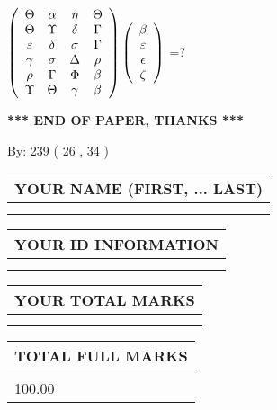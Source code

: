 \documentclass[12pt]{article}
\begin{document}
 
$  %
 \left( \begin{array}
 {
 c
 c
 c
 c
 }
 \Theta & 
 \alpha & 
 \eta & 
 \Theta \\ 
 \Theta & 
 \Upsilon & 
 \delta & 
 \Gamma \\ 
 \varepsilon & 
 \delta & 
 \sigma & 
 \Gamma \\ 
 \gamma & 
 \sigma & 
 \Delta & 
 \rho \\ 
 \rho & 
 \Gamma & 
 \Phi & 
 \beta \\ 
 \Upsilon & 
 \Theta & 
 \gamma & 
 \beta
 \end{array} \right)
 \left( \begin{array}
 {
 c
 }
 \beta \\ 
 \varepsilon \\ 
 \epsilon \\ 
                    \zeta
 \end{array} \right)
$ =?
 

 

 
\vspace{0.3in}
   
   
 \vspace{0.2in}
 
   
   
   
   
\vspace{1.0in} 
{\textbf{\large{ *** END OF PAPER, THANKS *** }}} 
   
   
\hspace{1.0in} By: 
         239 (          26 ,           34 )
   
   
   
   
\newpage 
\setcounter{page}{ 
    28001 } 
   
   
   
   
\noindent\begin{tabular}{|l|}
\hline
YOUR NAME (FIRST, ... LAST)  \\
\hline
 \\ 
 \\ 
\hline
\end{tabular}
\hspace{0.05in} \begin{tabular}{|l|}
\hline
 YOUR   ID   INFORMATION  \\
\hline
 \\ 
 \\ 
\hline
\end{tabular}
   
   
\vspace{0.2in}\noindent\begin{tabular}{|l|}
\hline
YOUR TOTAL MARKS  \\
\hline
 \\ 
 \\ 
\hline
\end{tabular}
\hspace{0.05in} \begin{tabular}{|l|}
\hline
TOTAL FULL MARKS  \\
\hline
 \\ 
100.00 \\
\hline
\end{tabular}
   
\end{document}
